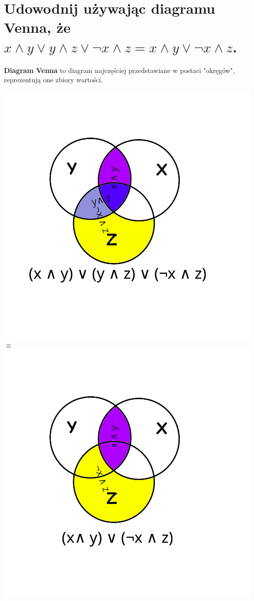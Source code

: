 \documentclass{article}
\begin{document}
\section{ Udowodnij używając \textbf{diagramu Venna}, że $x \wedge y \vee y \wedge z \vee \neg x \wedge z = x \wedge y \vee \neg x \wedge z$.}
\textbf{Diagram Venna} to diagram najczęściej przedstawiane w postaci "okręgów", reprezentują one zbiory wartości.
\begin{center}
	\includegraphics[scale=0.4]{./L01Z02czI.png} $\equiv$ \includegraphics[scale=0.4]{./L01Z02czII.png}
\end{center}
\end{document}
